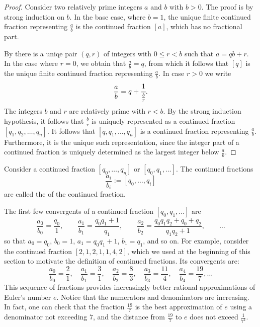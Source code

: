 \begin{proof}
  Consider two relatively prime integers $a$ and $b$ with $b>0$. The proof is by strong induction on $b$. In the base case, where $b=1$, the unique finite continued fraction representing $\frac{a}{b}$ is the continued fraction $[a]$, which has no fractional part. 

  By  there is a uniqe pair $(q,r)$ of integers with $0\leq r<b$ such that $a=qb+r$. In the case where $r=0$, we obtain that $\frac{a}{b}=q$, from which it follows that $[q]$ is the unique finite continued fraction representing $\frac{a}{b}$. In case $r>0$ we write
  \begin{equation*}
    \frac{a}{b} = q + \cfrac{1}{\frac{b}{r}}.
  \end{equation*}
  The integers $b$ and $r$ are relatively prime with $r<b$. By the strong induction hypothesis, it follows that $\frac{b}{r}$ is uniquely represented as a continued fraction $[q_1,q_2,\ldots,q_n]$. It follows that $[q,q_1,\ldots,q_n]$ is a continued fraction representing $\frac{a}{b}$. Furthermore, it is the unique such representation, since the integer part of a continued fraction is uniquely determined as the largest integer below $\frac{a}{b}$.
\end{proof}

\begin{definition}
  Consider a continued fraction $[q_0,\ldots,q_n]$ or $[q_0,q_1,\ldots]$. The continued fractions
  \begin{equation*}
    \frac{a_i}{b_i}:=[q_0,\ldots,q_i]
  \end{equation*}
  are called the  of the continued fraction.
\end{definition}

The first few convergents of a continued fraction $[q_0,q_1,\ldots]$ are
\begin{equation*}
  \frac{a_0}{b_0} = \frac{q_0}{1},\qquad
  \frac{a_1}{b_1} = \frac{q_0q_1+1}{q_1},\qquad
  \frac{a_2}{b_2} = \frac{q_0q_1q_2+q_0+q_2}{q_1q_2+1},\qquad
  \ldots
\end{equation*}
so that $a_0=q_0$, $b_0=1$, $a_1=q_0q_1+1$, $b_1=q_1$, and so on.
For example, consider the continued fraction $[2,1,2,1,1,4,2]$, which we used at the beginning of this section to motivate the definition of continued fractions. Its convergents are:
\begin{equation*}
  \frac{a_0}{b_0}=\frac{2}{1},\quad
  \frac{a_1}{b_1}=\frac{3}{1},\quad
  \frac{a_2}{b_2}=\frac{8}{3},\quad
  \frac{a_3}{b_3}=\frac{11}{4},\quad
  \frac{a_4}{b_4}=\frac{19}{7},
  \ldots
\end{equation*}
This sequence of fractions provides increasingly better rational approximations of Euler's number $e$. Notice that the numerators and denominators are increasing. In fact, one can check that the fraction $\frac{19}{7}$ is the best approximation of $e$ using a denominator not exceeding $7$, and the distance from $\frac{19}{7}$ to $e$ does not exceed $\frac{1}{7^2}$.

